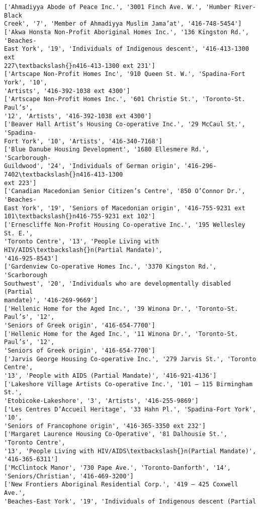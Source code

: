 \documentclass[11pt]{article}
\begin{document}
    \begin{Verbatim}[commandchars=\\\{\}]
['Ahmadiyya Abode of Peace Inc.', '3001 Finch Ave. W.', 'Humber River-Black
Creek', '7', 'Member of Ahmadiyya Muslim Jama’at', '416-748-5454']
['Akwa Honsta Non-Profit Aboriginal Homes Inc.', '136 Kingston Rd.', 'Beaches-
East York', '19', 'Individuals of Indigenous descent', '416-413-1300 ext
227\textbackslash{}n416-413-1300 ext 231']
['Artscape Non-Profit Homes Inc', '910 Queen St. W.', 'Spadina-Fort York', '10',
'Artists', '416-392-1038 ext 4300']
['Artscape Non-Profit Homes Inc.', '601 Christie St.', 'Toronto-St. Paul’s',
'12', 'Artists', '416-392-1038 ext 4300']
['Beaver Hall Artist’s Housing Co-operative Inc.', '29 McCaul St.', 'Spadina-
Fort York', '10', 'Artists', '416-340-7168']
['Blue Danube Housing Development', '1680 Ellesmere Rd.', 'Scarborough-
Guildwood', '24', 'Individuals of German origin', '416-296-7402\textbackslash{}n416-413-1300
ext 223']
['Canadian Macedonian Senior Citizen’s Centre', '850 O’Connor Dr.', 'Beaches-
East York', '19', 'Seniors of Macedonian origin', '416-755-9231 ext
101\textbackslash{}n416-755-9231 ext 102']
['Ernescliffe Non-Profit Housing Co-operative Inc.', '195 Wellesley St. E.',
'Toronto Centre', '13', 'People Living with HIV/AIDS\textbackslash{}n(Partial Mandate)',
'416-925-8543']
['Gardenview Co-operative Homes Inc.', '3370 Kingston Rd.', 'Scarborough
Southwest', '20', 'Individuals who are developmentally disabled (Partial
mandate)', '416-269-9669']
['Hellenic Home for the Aged Inc.', '39 Winona Dr.', 'Toronto-St. Paul’s', '12',
'Seniors of Greek origin', '416-654-7700']
['Hellenic Home for the Aged Inc.', '11 Winona Dr.', 'Toronto-St. Paul’s', '12',
'Seniors of Greek origin', '416-654-7700']
['Jarvis George Housing Co-operative Inc.', '279 Jarvis St.', 'Toronto Centre',
'13', 'People with AIDS (Partial Mandate)', '416-921-4136']
['Lakeshore Village Artists Co-operative Inc.', '101 – 115 Birmingham St.',
'Etobicoke-Lakeshore', '3', 'Artists', '416-255-9869']
['Les Centres D’Accueil Heritage', '33 Hahn Pl.', 'Spadina-Fort York', '10',
'Seniors of Francophone origin', '416-365-3350 ext 232']
['Margaret Laurence Housing Co-Operative', '81 Dalhousie St.', 'Toronto Centre',
'13', 'People Living with HIV/AIDS\textbackslash{}n(Partial Mandate)', '416-365-6311']
['McClintock Manor', '730 Pape Ave.', 'Toronto-Danforth', '14',
'Seniors/Christian', '416-469-3200']
['New Frontiers Aboriginal Residential Corp.', '419 – 425 Coxwell Ave.',
'Beaches-East York', '19', 'Individuals of Indigenous descent (Partial

\end{Verbatim}
\end{document}
